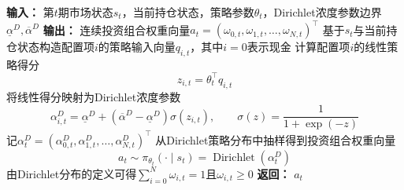 \documentclass{sufethesismas}
\begin{document}
\begin{algorithm}[H]
\caption{Dirichlet策略函数}
\label{alg:dirichlet_policy1}
\begin{algorithmic}[1]
\STATE \textbf{输入：} 第$t$期市场状态$s_t$，当前持仓状态，策略参数$\theta_t$，Dirichlet浓度参数边界$\underline{\alpha}^D,\overline{\alpha}^D$
\STATE \textbf{输出：} 连续投资组合权重向量$a_t=(\omega_{0,t},\omega_{1,t},\dots,\omega_{N,t})^\top$
    \STATE 基于$s_t$与当前持仓状态构造配置项$i$的策略输入向量$q_{i,t}$，其中$i=0$表示现金
    \STATE 计算配置项$i$的线性策略得分
    \begin{equation*}
    z_{i,t}=\theta_t^\top q_{i,t}
    \end{equation*}
    \STATE 将线性得分映射为Dirichlet浓度参数
    \begin{equation*}
    \alpha^D_{i,t}
    =
    \underline{\alpha}^D
    +
    \left(\overline{\alpha}^D-\underline{\alpha}^D\right)
    \sigma(z_{i,t}),
    \qquad
    \sigma(z)=\frac{1}{1+\exp(-z)}
    \end{equation*}
\ENDFOR
\STATE 记$\alpha^D_t=(\alpha^D_{0,t},\alpha^D_{1,t},\dots,\alpha^D_{N,t})^\top$
\STATE 从Dirichlet策略分布中抽样得到投资组合权重向量
\begin{equation*}
a_t
\sim
\pi_{\theta_t}(\cdot\mid s_t)
=
\operatorname{Dirichlet}(\alpha^D_t)
\end{equation*}
\STATE 由Dirichlet分布的定义可得$\sum_{i=0}^{N}\omega_{i,t}=1$且$\omega_{i,t}\ge 0$
\STATE \textbf{返回：} $a_t$
\end{algorithmic}
\end{algorithm}
\end{document}

